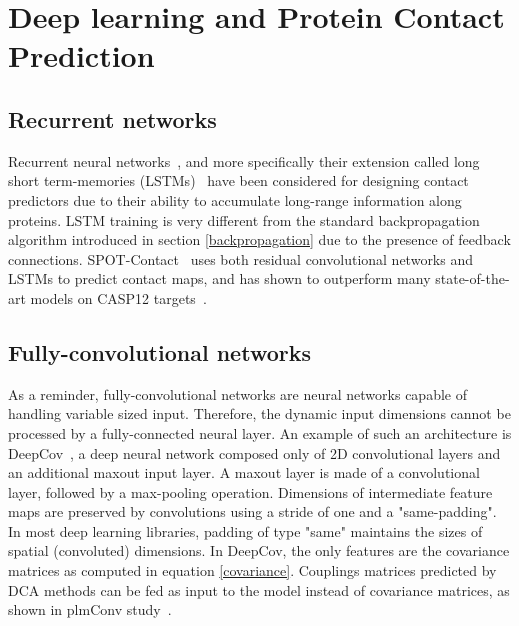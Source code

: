 \section{Deep learning and Protein Contact Prediction} \label{dlpredictors}

    \subsection{Recurrent networks}

        Recurrent neural networks~\cite{cleeremans1989finite}, and more specifically their
        extension called long short term-memories (LSTMs)~\cite{hochreiter1997long} have been considered
        for designing contact predictors due to their ability to accumulate long-range information
        along proteins. LSTM training is very different from the standard backpropagation algorithm
        introduced in section \ref{backpropagation} due to the presence of feedback connections.
        SPOT-Contact~\cite{hanson2018accurate} uses both residual convolutional networks
        and LSTMs to predict contact maps, and has shown to outperform many state-of-the-art
        models on CASP12 targets~\cite{moult2018critical}.

    \subsection{Fully-convolutional networks}

        As a reminder, fully-convolutional networks are neural networks capable
        of handling variable sized input. Therefore, the dynamic input dimensions
        cannot be processed by a fully-connected neural layer.
        An example of such an architecture is DeepCov~\cite{doi:10.1093/bioinformatics/bty341},
        a deep neural network composed only of 2D convolutional layers and an additional
        maxout input layer. A maxout layer is made of a convolutional layer, followed
        by a max-pooling operation. Dimensions of intermediate feature maps are preserved
        by convolutions using a stride of one and a "same-padding". In most deep learning
        libraries, padding of type "same"
        maintains the sizes of spatial (convoluted) dimensions.
        In DeepCov, the only features are the covariance matrices as computed
        in equation \ref{covariance}. Couplings matrices predicted by DCA methods can be fed as
        input to the model instead of covariance matrices, as shown in plmConv study~\cite{golkov2016protein}.

